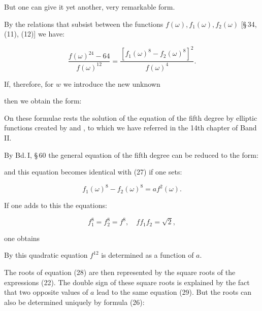 
But one can give it yet another, very remarkable form.

By the relations that subsist between the functions $f(\omega), f_1(\omega), f_2(\omega)$
[§\,34, (11), (12)] we have:

\[
\frac{f(\omega)^{24} - 64}{f(\omega)^{12}} = \frac{[f_1(\omega)^8 - f_2(\omega)^8]^2}{f(\omega)^4}.
\]

If, therefore, for $w$ we introduce the new unknown


then we obtain the form:


On these formulae rests the solution of the equation of the fifth degree by
elliptic functions created by  and , to
which we have referred in the 14th chapter of Band II.

By Bd.\,I, §\,60 the general equation of the fifth degree can be reduced to the
form:


and this equation becomes identical with (27) if one sets:

\[
f_1(\omega)^8 - f_2(\omega)^8 = af^2(\omega).
\]

If one adds to this the equations:

\[
f_1^8 = f_2^8 = f^8, \quad ff_1f_2 = \sqrt{2}, %
\]

one obtains


By this quadratic equation $f^{12}$ is determined as a function of $a$.

The roots of equation (28) are then represented by the square roots of the
expressions (22). The double sign of these square roots is explained by the
fact that two opposite values of $a$ lead to the same equation (29). But the
roots can also be determined uniquely by formula (26):

